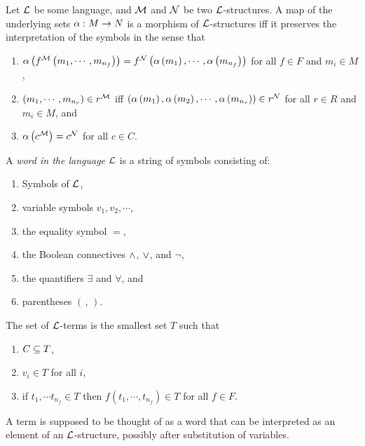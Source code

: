 \documentclass{amsart}
\begin{document}
\begin{defn}
Let $\mathcal{L}$ be some language, and $\mathcal{M}$ and $\mathcal{N}$ be 
two $\mathcal{L}$-structures.
A map of the underlying sets $\alpha:M\rightarrow N$
is a morphism of $\mathcal{L}$-structures iff it preserves
the interpretation of the symbols in the sense that
\begin{enumerate}
\item $\alpha\left( f^{\mathcal{M}}\left( m_1 , \cdots , m_{n_f} \right) \right)
= f^{\mathcal{N}}\left( \alpha\left( m_1 \right) , \cdots , \alpha\left( m_{n_f} \right) \right)$
for all $f\in F$ and $m_i \in M$,
\item $\left( m_1 , \cdots , m_{n_r} \right) \in r^{\mathcal{M}}$ iff
$\left( \alpha\left( m_1 \right) , \alpha\left( m_2 \right) , \cdots , 
\alpha\left( m_{n_r} \right) \right)\in r^{\mathcal{N}}$ for all $r\in R$ and $m_i\in M$, and
\item $\alpha\left( c^{\mathcal{M}} \right) = c^{\mathcal{N}}$ for all $c\in C$.
\end{enumerate}
\end{defn}

\begin{defn}
A \emph{word in the language $\mathcal{L}$} is a string of symbols consisting of:
\begin{enumerate}
\item Symbols of $\mathcal{L}$,
\item variable symbols $v_1 , v_2 , \cdots$,
\item the equality symbol $=$,
\item the Boolean connectives $\wedge$, $\vee$, and $\neg$,
\item the quantifiers $\exists$ and $\forall$, and
\item parentheses $\left( \, , \, \right)$.
\end{enumerate}
\end{defn}

\begin{defn}
The set of $\mathcal{L}$-terms is the smallest set $T$ such that 
\begin{enumerate}
\item $C\subseteq T$,
\item $v_i\in T$ for all $i$,
\item if $t_1 , \cdots t_{n_f}\in T$ then $f\left( t_1 , \cdots , t_{n_f} \right)\in T$
for all $f\in F$.
\end{enumerate}
\end{defn}

\begin{rmk}
A term is supposed to be thought of as a word that can be interpreted 
as an element of an $\mathcal{L}$-structure, possibly
after substitution of variables.
\end{rmk}
\end{document}

